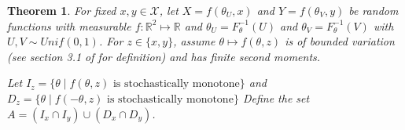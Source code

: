\documentclass{article}
\theoremstyle{plain}%
\newtheorem{theorem}{Theorem}[section]
\theoremstyle{definition}
\theoremstyle{remark}
\begin{document}
	
	\begin{theorem}\label{thm:crngen}
		For fixed $x, y \in \mathcal{X}$, let $X = f(\theta_U,x)$ and $Y = f(\theta_V,y)$ be random functions with measurable $f: \mathbb{R}^2 \mapsto \mathbb{R}$ and $\theta_U = F^{-1}_{\theta}(U)$ and $\theta_V = F^{-1}_{\theta}(V)$ with $U,V\sim Unif(0,1)$. 
		For $z \in \{x,y\}$, assume $\theta \mapsto f(\theta, z)$ is of bounded variation (see section 3.1 of \cite{realanalysis} for definition) and has finite second moments. 
		
		Let $I_z=\{\theta\mid f(\theta,z)\text{ is stochastically monotone}\}$ and $D_z=\{\theta\mid f(-\theta,z)\text{ is stochastically monotone}\}$
		Define the set $A =(I_x\cap I_y)\cup (D_x\cap D_y)$.
		

\end{theorem}
\end{document}
